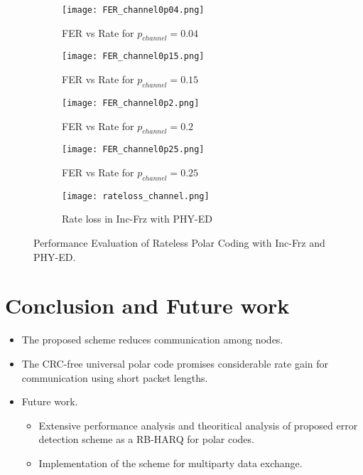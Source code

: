 \documentclass[
11pt, %
a4paper, %
oneside, %
headinclude,footinclude, %
BCOR5mm, %
]{scrartcl}
\begin{document}
\begin{figure}[h]
\centering
\begin{subfigure}{.5\textwidth}
  \centering
  \texttt{[image: FER\_channel0p04.png]}
  \caption{FER vs Rate for $p_{channel}=0.04$}
  \label{fig:pch1}
\end{subfigure}%
\begin{subfigure}{.5\textwidth}
  \centering
  \texttt{[image: FER\_channel0p15.png]}
  \caption{FER vs Rate for $p_{channel}=0.15$}
  \label{fig:pch2}
\end{subfigure}
\begin{subfigure}{.5\textwidth}
  \centering
  \texttt{[image: FER\_channel0p2.png]}
  \caption{FER vs Rate for $p_{channel}=0.2$}
  \label{fig:pch3}
\end{subfigure}%
\begin{subfigure}{.5\textwidth}
  \centering
  \texttt{[image: FER\_channel0p25.png]}
  \caption{FER vs Rate for $p_{channel}=0.25$}
  \label{fig:pch4}
\end{subfigure}
\begin{subfigure}{.5\textwidth}
  \centering
  \texttt{[image: rateloss\_channel.png]}
  \caption{Rate loss in Inc-Frz with PHY-ED}
  \label{fig:rlch}
\end{subfigure}
\caption{Performance Evaluation of Rateless Polar Coding with Inc-Frz and PHY-ED.}
\label{fig:perfch}
\end{figure}
\clearpage
\section{Conclusion and Future work}\label{future}
\begin{itemize}
\item The proposed scheme reduces communication among nodes.
\item The CRC-free universal polar code promises considerable rate gain for communication using short packet lengths.
\end{itemize}
\begin{itemize}
\item Future work.
\begin{itemize}
\item Extensive performance analysis and theoritical analysis of proposed error detection scheme as a RB-HARQ for polar codes.
\item Implementation of the scheme for multiparty data exchange.
\end{itemize}
\end{itemize}
\end{document}
